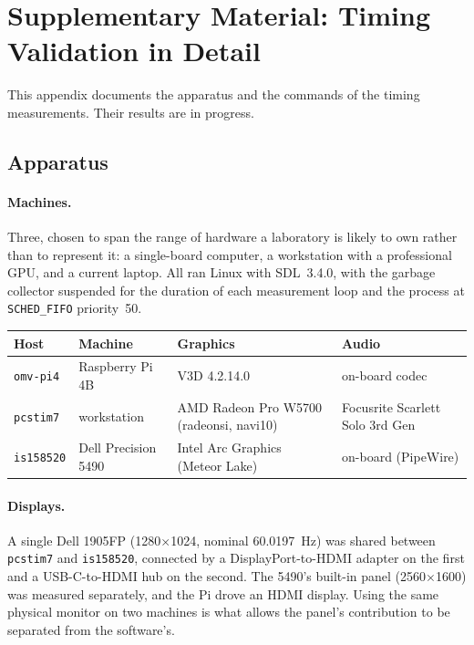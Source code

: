 \documentclass[doc,a4paper,floatsintext]{apa7}
\begin{document}
\clearpage

\printbibliography


\clearpage
\appendix

\section{Supplementary Material: Timing Validation in Detail}\label{app:timing}

This appendix documents the apparatus and the commands of the timing
measurements. Their results are in progress.

\subsection{Apparatus}

\paragraph{Machines.} Three, chosen to span the range of hardware a laboratory
is likely to own rather than to represent it: a single-board computer, a
workstation with a professional GPU, and a current laptop. All ran Linux with
SDL~3.4.0, with the garbage collector suspended for the duration of each
measurement loop and the process at \texttt{SCHED\_FIFO} priority~50.

\begin{center}
\scriptsize
\begin{tabular}{llll}
\hline \hline
Host & Machine & Graphics & Audio \\
\hline
\texttt{omv-pi4}   & Raspberry Pi 4B          & V3D 4.2.14.0                & on-board codec \\
\texttt{pcstim7}   & workstation              & AMD Radeon Pro W5700 (radeonsi, navi10) & Focusrite Scarlett Solo 3rd Gen \\
\texttt{is158520}  & Dell Precision 5490      & Intel Arc Graphics (Meteor Lake) & on-board (PipeWire) \\
\hline
\end{tabular}
\end{center}

\paragraph{Displays.} A single Dell 1905FP (1280$\times$1024, nominal 60.0197~Hz)
was shared between \texttt{pcstim7} and \texttt{is158520}, connected by a
DisplayPort-to-HDMI adapter on the first and a USB-C-to-HDMI hub on the second.
The 5490's built-in panel (2560$\times$1600) was measured separately, and the
Pi drove an HDMI display. Using the same physical monitor on two machines is
what allows the panel's contribution to be separated from the software's.
\end{document}

